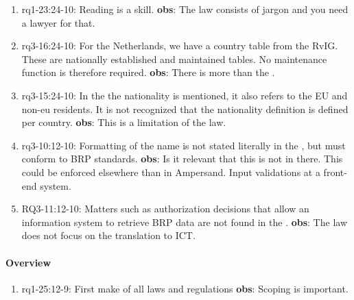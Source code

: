 \begin{enumerate}
    \item rq1-23:24-10:  Reading is a skill.
    \newline\textbf{obs}: The law consists of jargon and you need a lawyer for that.

    \item rq3-16:24-10: For the Netherlands, we have a country table from the RvIG.
    These are nationally established and maintained tables.
    No maintenance function is therefore required.
    \newline\textbf{obs}: There is more than the .

    \item rq3-15:24-10: In the  the nationality is mentioned, it also refers to the EU and non-eu residents.
    It is not recognized that the nationality definition is defined per country.
    \newline\textbf{obs}: This is a limitation of the law.

    \item rq3-10:12-10: Formatting of the name is not stated literally in the , but must conform to BRP standards.
    \newline\textbf{obs}: Is it relevant that this is not in there.
    This could be enforced elsewhere than in Ampersand.
    Input validations at a front-end system.
     
    \item RQ3-11:12-10: Matters such as authorization decisions that allow an information system to retrieve BRP data are not found in the .
    \newline\textbf{obs}: The law does not focus on the translation to ICT.
    
\end{enumerate}

\paragraph{Overview}
\begin{enumerate}
    \item rq1-25:12-9: First make  of all laws and regulations
    \newline\textbf{obs}: Scoping is important.

\end{enumerate}

